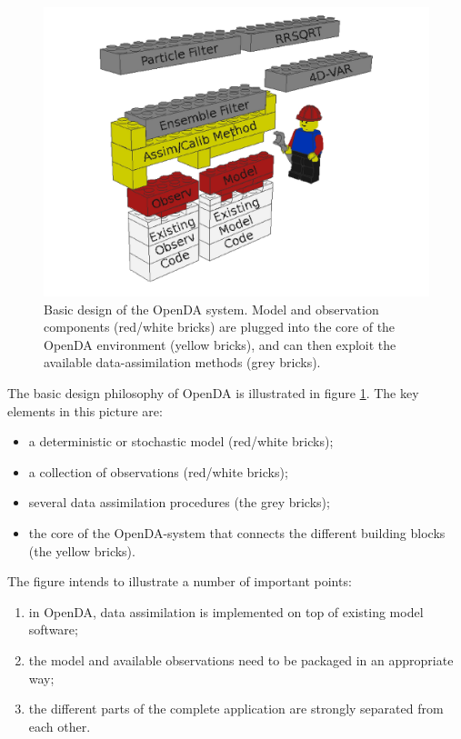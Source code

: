 \begin{figure}[ht]
\center
\includegraphics[width=1.0\textwidth]{getting_started/figures/legocomponents2.png}
\caption{Basic design of the OpenDA system. Model and observation components (red/white bricks) are plugged into the core of the OpenDA environment (yellow bricks), and can then exploit the available data-assimilation methods (grey bricks).}
\label{fig:legoblocks}
\end{figure}

The basic design philosophy of OpenDA is illustrated in figure \ref{fig:legoblocks}. The key elements in this picture are:

\begin{itemize}
\item a deterministic or stochastic model (red/white bricks);
\item a collection of observations (red/white bricks);
\item several data assimilation procedures (the grey bricks);
\item the core of the OpenDA-system that connects the different building blocks (the yellow bricks).
\end{itemize}

The figure intends to illustrate a number of important points:

\begin{enumerate}
\item in OpenDA, data assimilation is implemented on top of existing model software;
\item the model and available observations need to be packaged in an appropriate way;
\item the different parts of the complete application are strongly separated from each other.
\end{enumerate}
    

